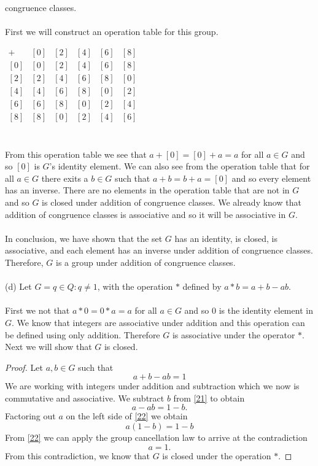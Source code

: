 \documentclass[11pt,a4paper]{article}
\begin{document}
congruence classes.\\
~\\
First we will construct an operation table for this group.
\begin{center}
$
\begin{array}{c|c|c|c|c|c}
+ & [0] & [2] & [4] & [6] & [8] \\\hline
[0] & [0] & [2] & [4] & [6] & [8] \\\hline
[2] & [2] & [4] & [6] & [8] & [0] \\\hline
[4] & [4] & [6] & [8] & [0] & [2] \\\hline
[6] & [6] & [8] & [0] & [2] & [4] \\\hline
[8] & [8] & [0] & [2] & [4] & [6] \\
\end{array}
$
\end{center}
~\\
From this operation table we see that $a + [0] = [0] + a = a$ for all $a\in G$ and so $[0]$ is $G$'s identity element. We can also see from the operation table that for all $a \in G$ there exits a $b\in G$ such that $a + b = b + a = [0]$ and so every element has an inverse. There are no elements in the operation table that are not in $G$ and so $G$ is closed under addition of congruence classes. We already know that addition of congruence classes is associative and so it will be associative in $G$.\\
~\\
In conclusion, we have shown that the set $G$ has an identity, is closed, is associative, and each element has an inverse under addition of congruence classes. Therefore, $G$ is a group under addition of congruence classes.\\
~\\
(d) Let  $G = {q \in Q : q \neq 1}$, with the operation $*$ defined by $a * b = a + b - ab$.\\
~\\
First we not that $a * 0 = 0 * a = a$ for all $a\in G$ and so $0$ is the identity element in $G$. We know that integers are associative under addition and this operation can be defined using only addition. Therefore $G$ is associative under the operator $*$. Next we will show that $G$ is closed.
\begin{proof}
Let $a,b \in G$ such that
\begin{equation}\label{21}
a+b - ab = 1
\end{equation}
We are working with integers under addition and subtraction which we now is commutative and associative. We subtract $b$ from \eqref{21} to obtain
\begin{equation}\label{22}
a-ab = 1-b.
\end{equation}
Factoring out $a$ on the left side of \eqref{22} we obtain
\begin{equation}\label{23}
a(1-b) = 1-b
\end{equation}
From \eqref{22} we can apply the group cancellation law to arrive at the contradiction
\[a = 1.\]
From this contradiction, we know that $G$ is closed under the operation $*$. 
\end{proof}
\end{document}
